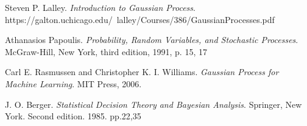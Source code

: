 \documentclass[12pt,a4paper]{article}
\theoremstyle{definition}
\numberwithin{equation}{section}
\begin{document}
%
%
%
%
%
\newpage
\begin{thebibliography}{10}

Steven P. Lalley.
\textit{Introduction to Gaussian Process}. 
https://galton.uchicago.edu/~lalley/Courses/386/GaussianProcesses.pdf

Athanasios Papoulis.
\textit{Probability, Random Variables, and Stochastic Processes}. 
McGraw-Hill, New York, third edition, 1991, p. 15, 17

Carl E. Rasmussen and Christopher K. I. Williams.
\textit{Gaussian Process for Machine Learning}. 
MIT Press, 2006.

J. O. Berger.
\textit{Statistical Decision Theory and Bayesian Analysis}. 
Springer, New York. Second edition. 1985. pp.22,35

%
%
%
%
%
\end{thebibliography}
%
\end{document}
